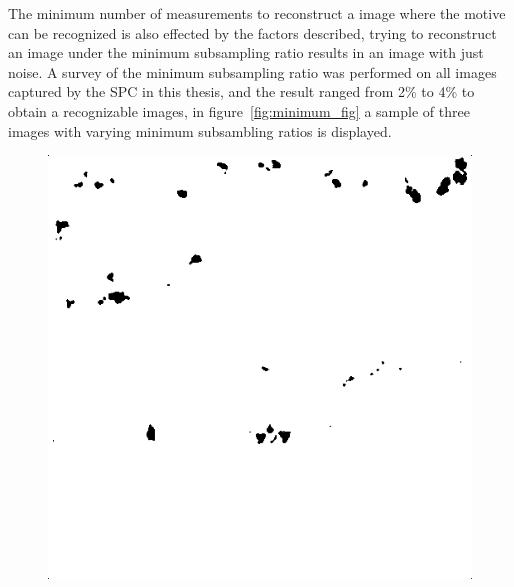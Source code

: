 The minimum number of measurements to reconstruct a image where the motive can be recognized is also effected by the factors described, trying to reconstruct an image under the minimum subsampling ratio results in an image with just noise. A survey of the minimum subsampling ratio was performed on all images captured by the SPC in this thesis, and the result ranged from 2\% to 4\% to obtain a recognizable images, in figure~\ref{fig:minimum_fig} a sample of three images with varying minimum subsambling ratios is displayed.


\begin{figure}[H]
\begin{minipage}[t]{0.32\linewidth} %
	\includegraphics[width = 1\linewidth]{result/minimum/24_512_m2.PNG}
	\label{fig:minimum_car}
\end{minipage}
\begin{minipage}[t]{0.32\linewidth} %

\end{minipage}
\end{figure}
